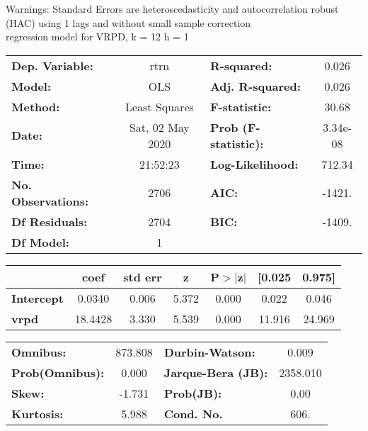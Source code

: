 Warnings: \newline
 [1] Standard Errors are heteroscedasticity and autocorrelation robust (HAC) using 1 lags and without small sample correction\\ 

regression model for VRPD, k = 12 h = 1\begin{center}
\begin{tabular}{lclc}
\toprule
\textbf{Dep. Variable:}    &       rtrn       & \textbf{  R-squared:         } &     0.026   \\
\textbf{Model:}            &       OLS        & \textbf{  Adj. R-squared:    } &     0.026   \\
\textbf{Method:}           &  Least Squares   & \textbf{  F-statistic:       } &     30.68   \\
\textbf{Date:}             & Sat, 02 May 2020 & \textbf{  Prob (F-statistic):} &  3.34e-08   \\
\textbf{Time:}             &     21:52:23     & \textbf{  Log-Likelihood:    } &    712.34   \\
\textbf{No. Observations:} &        2706      & \textbf{  AIC:               } &    -1421.   \\
\textbf{Df Residuals:}     &        2704      & \textbf{  BIC:               } &    -1409.   \\
\textbf{Df Model:}         &           1      & \textbf{                     } &             \\
\bottomrule
\end{tabular}
\begin{tabular}{lcccccc}
                   & \textbf{coef} & \textbf{std err} & \textbf{z} & \textbf{P$> |$z$|$} & \textbf{[0.025} & \textbf{0.975]}  \\
\midrule
\textbf{Intercept} &       0.0340  &        0.006     &     5.372  &         0.000        &        0.022    &        0.046     \\
\textbf{vrpd}      &      18.4428  &        3.330     &     5.539  &         0.000        &       11.916    &       24.969     \\
\bottomrule
\end{tabular}
\begin{tabular}{lclc}
\textbf{Omnibus:}       & 873.808 & \textbf{  Durbin-Watson:     } &    0.009  \\
\textbf{Prob(Omnibus):} &   0.000 & \textbf{  Jarque-Bera (JB):  } & 2358.010  \\
\textbf{Skew:}          &  -1.731 & \textbf{  Prob(JB):          } &     0.00  \\
\textbf{Kurtosis:}      &   5.988 & \textbf{  Cond. No.          } &     606.  \\
\bottomrule
\end{tabular}
\end{center}

